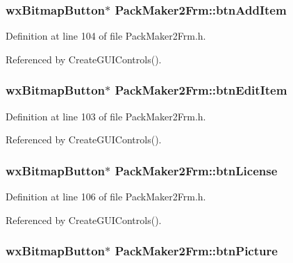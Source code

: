 \subsubsection{\setlength{\rightskip}{0pt plus 5cm}wx\-Bitmap\-Button$\ast$ {\bf Pack\-Maker2Frm::btn\-Add\-Item}\hspace{0.3cm}{\tt  [private]}}\label{class_pack_maker2_frm_ac14f6db35841bb293a967f72324ffdf}




Definition at line 104 of file Pack\-Maker2Frm.h.

Referenced by Create\-GUIControls().
\subsubsection{\setlength{\rightskip}{0pt plus 5cm}wx\-Bitmap\-Button$\ast$ {\bf Pack\-Maker2Frm::btn\-Edit\-Item}\hspace{0.3cm}{\tt  [private]}}\label{class_pack_maker2_frm_c4c1a845195ceb07c4385023556d3d00}




Definition at line 103 of file Pack\-Maker2Frm.h.

Referenced by Create\-GUIControls().
\subsubsection{\setlength{\rightskip}{0pt plus 5cm}wx\-Bitmap\-Button$\ast$ {\bf Pack\-Maker2Frm::btn\-License}\hspace{0.3cm}{\tt  [private]}}\label{class_pack_maker2_frm_2d54c02a83ff79af7a90ce30321f9cce}




Definition at line 106 of file Pack\-Maker2Frm.h.

Referenced by Create\-GUIControls().
\subsubsection{\setlength{\rightskip}{0pt plus 5cm}wx\-Bitmap\-Button$\ast$ {\bf Pack\-Maker2Frm::btn\-Picture}\hspace{0.3cm}{\tt  [private]}}\label{class_pack_maker2_frm_a9958343b0c692285295db8a2d65d373}





